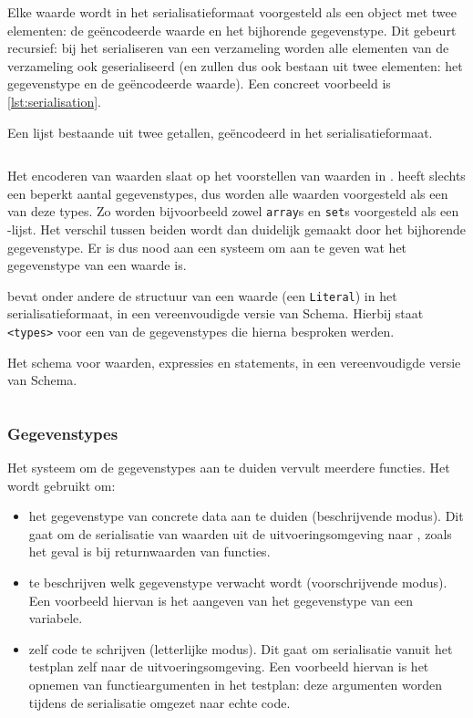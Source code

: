 Elke waarde wordt in het serialisatieformaat voorgesteld als een object met twee elementen: de geëncodeerde waarde en het bijhorende gegevenstype.
Dit gebeurt recursief: bij het serialiseren van een verzameling worden alle elementen van de verzameling ook geserialiseerd (en zullen dus ook bestaan uit twee elementen: het gegevenstype en de geëncodeerde waarde).
Een concreet voorbeeld is \cref{lst:serialisation}.

\begin{listing}
    \caption{Een lijst bestaande uit twee getallen, geëncodeerd in het serialisatieformaat.}
    \label{lst:serialisation}
    \inputminted{json}{code/testplan-value-list.json}
\end{listing}

Het encoderen van waarden slaat op het voorstellen van waarden in .
 heeft slechts een beperkt aantal gegevenstypes, dus worden alle waarden voorgesteld als een van deze types.
Zo worden bijvoorbeeld zowel \texttt{array}s en \texttt{set}s voorgesteld als een -lijst.
Het verschil tussen beiden wordt dan duidelijk gemaakt door het bijhorende gegevenstype.
Er is dus nood aan een systeem om aan te geven wat het gegevenstype van een waarde is.

 bevat onder andere de structuur van een waarde (een \texttt{Literal}) in het serialisatieformaat, in een vereenvoudigde versie van  Schema.
Hierbij staat \texttt{<types>} voor een van de gegevenstypes die hierna besproken werden.

\begin{listing}
    \caption{Het schema voor waarden, expressies en statements, in een vereenvoudigde versie van  Schema.}
    \label{lst:type-schema}
    \inputminted{json}{code/type-schema.json}
\end{listing}

\clearpage

\subsubsection{Gegevenstypes}

Het systeem om de gegevenstypes aan te duiden vervult meerdere functies.
Het wordt gebruikt om:

\begin{itemize}
    \item het gegevenstype van concrete data aan te duiden (beschrijvende modus).
    Dit gaat om de serialisatie van waarden uit de uitvoeringsomgeving naar \tested{}, zoals het geval is bij returnwaarden van functies.
    \item te beschrijven welk gegevenstype verwacht wordt (voorschrijvende modus).
    Een voorbeeld hiervan is het aangeven van het gegevenstype van een variabele.
    \item zelf code te schrijven (letterlijke modus).
    Dit gaat om serialisatie vanuit het testplan zelf naar de uitvoeringsomgeving.
    Een voorbeeld hiervan is het opnemen van functieargumenten in het testplan: deze argumenten worden tijdens de serialisatie omgezet naar echte code.
\end{itemize}

